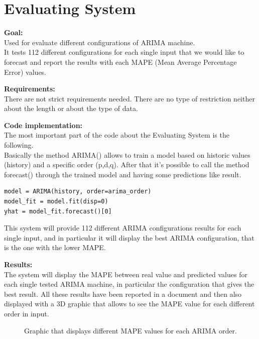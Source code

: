 \newpage
\section{Evaluating System}
\textbf{Goal:}\\ 
Used for evaluate different configurations of ARIMA machine. \\ 
It tests 112 different configurations for each single input that we would like to forecast and report the results with each MAPE (Mean Average Percentage Error) values.

\textbf{Requirements:}\\
There are not strict requirements needed. There are no type of restriction neither about the length or about the type of data.

\textbf{Code implementation:}\\
The most important part of the code about the Evaluating System is the following.\\
Basically the method ARIMA() allows to train a model based on historic values (history) and a specific order (p,d,q). After that it's possible to call the method forecast() through the trained model and having some predictions like result.
\begin{lstlisting}
model = ARIMA(history, order=arima_order)
model_fit = model.fit(disp=0)
yhat = model_fit.forecast()[0]
\end{lstlisting}

This system will provide 112 different ARIMA configurations results for each single input, and in particular it will display the best ARIMA configuration, that is the one with the lower MAPE.

\textbf{Results:}\\
The system will display the MAPE between real value and predicted values for each single tested ARIMA machine, in particular the configuration that gives the best result.
All these results have been reported in a document and then also displayed with a 3D graphic that allows to see the MAPE value for each different order in input.

\begin{figure}[H]
	\raggedleft
    \caption{Graphic that displays different MAPE values for each ARIMA order.}
\end{figure}


